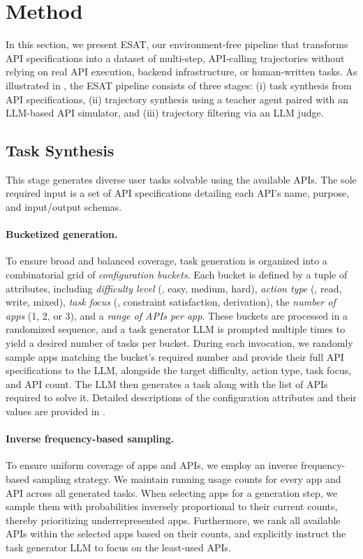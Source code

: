 \section{Method}
In this section, we present \textsc{ESAT}, our environment-free pipeline that transforms API specifications into a dataset of multi-step, API-calling trajectories without relying on real API execution, backend infrastructure, or human-written tasks. As illustrated in , the \textsc{ESAT} pipeline consists of three stages: (i) task synthesis from API specifications, (ii) trajectory synthesis using a teacher agent paired with an LLM-based API simulator, and (iii) trajectory filtering via an LLM judge.


\subsection{Task Synthesis}
This stage generates diverse user tasks solvable using the available APIs. The sole required input is a set of API specifications detailing each API's name, purpose, and input/output schemas.

\paragraph{Bucketized generation.} To ensure broad and balanced coverage, task generation is organized into a combinatorial grid of \emph{configuration buckets}. Each bucket is defined by a tuple of attributes, including \emph{difficulty level} (\eg, easy, medium, hard), \emph{action type} (\eg, read, write, mixed), \emph{task focus} (\eg, constraint satisfaction, derivation), the \emph{number of apps} (1, 2, or 3), and a \emph{range of APIs per app}. These buckets are processed in a randomized sequence, and a task generator LLM is prompted multiple times to yield a desired number of tasks per bucket. During each invocation, we randomly sample apps matching the bucket's required number and provide their full API specifications to the LLM, alongside the target difficulty, action type, task focus, and API count. The LLM then generates a task along with the list of APIs required to solve it. Detailed descriptions of the configuration attributes and their values are provided in .

\paragraph{Inverse frequency-based sampling.} To ensure uniform coverage of apps and APIs, we employ an inverse frequency-based sampling strategy. We maintain running usage counts for every app and API across all generated tasks. When selecting apps for a generation step, we sample them with probabilities inversely proportional to their current counts, thereby prioritizing underrepresented apps. Furthermore, we rank all available APIs within the selected apps based on their counts, and explicitly instruct the task generator LLM to focus on the least-used APIs.

